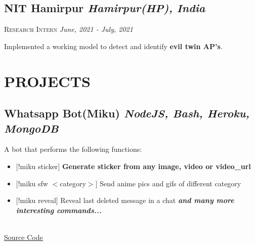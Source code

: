 \documentclass[12pt]{article}
\begin{document}
\subsection*{NIT Hamirpur \hfill \normalsize \normalfont \textit{Hamirpur(HP), India}}
\vspace{-1ex}
\textsc{\textmd{Research Intern}} \hfill \normalsize \textit{June, 2021 - July, 2021}
\vspace{-1ex}

\begin{description}
\setlength{\itemindent}{2\parindent}
\setlength{\itemsep}{0em}
\item[$\bullet$]{Implemented a working model to detect and identify \textbf{evil twin AP's}.}
\end{description}


\section{PROJECTS}

\subsection*{Whatsapp Bot(Miku) \hfill \normalsize \textit{NodeJS, Bash, Heroku, MongoDB}}
  \parbox{\textwidth}{ A bot that performs the following functions:   
\setlength{\itemsep}{0em}
  \begin{itemize}
    \item{[!miku sticker] \textbf{Generate sticker from any image, video or video\_url }}
    \item{[!miku sfw $<$category$>$] Send anime pics and gifs of different category}
    \item{[!miku reveal] Reveal last deleted message in a chat}
      \emph{\textbf{and many more interesting commands...}}
  \end{itemize}
  \\ \underline{\href{https://github.com/HARSH-SHETH/miku}{Source Code}}
  }
  \vspace{2mm}
\end{document}
